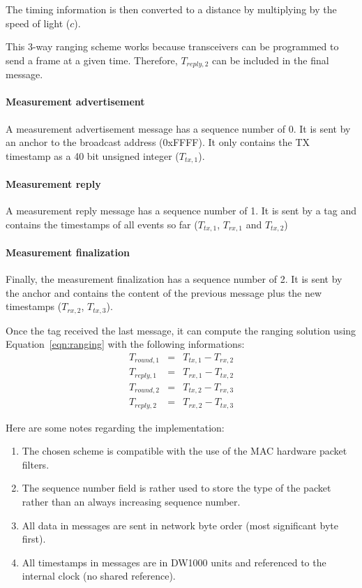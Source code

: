 \documentclass[a4paper, 12pt]{scrreprt}
\begin{document}
The timing information is then converted to a distance by multiplying by the speed of light ($c$).

This 3-way ranging scheme works because transceivers can be programmed to send a frame at a given time.
Therefore, $T_{reply,2}$ can be included in the final message.

\paragraph{Measurement advertisement}
A measurement advertisement message has a sequence number of 0.
It is sent by an anchor to the broadcast address (0xFFFF).
It only contains the TX timestamp as a 40 bit unsigned integer ($T_{tx,1}$).

\paragraph{Measurement reply}
A measurement reply message has a sequence number of 1.
It is sent by a tag and contains the timestamps of all events so far ($T_{tx,1}$, $T_{rx,1}$ and $T_{tx,2}$)

\paragraph{Measurement finalization}
Finally, the measurement finalization has a sequence number of 2.
It is sent by the anchor and contains the content of the previous message plus the new timestamps ($T_{rx,2}$, $T_{tx,3}$).

Once the tag received the last message, it can compute the ranging solution using Equation~\ref{eqn:ranging} with the following informations:
\begin{eqnarray*}
    T_{round,1} &=& T_{tx,1} - T_{rx,2} \\
    T_{reply,1} &=& T_{rx,1} - T_{tx,2} \\
    T_{round,2} &=& T_{tx,2} - T_{rx,3} \\
    T_{reply,2} &=& T_{rx,2} - T_{tx,3}
\end{eqnarray*}




Here are some notes regarding the implementation:

\begin{enumerate}
    \item The chosen scheme is compatible with the use of the  \ieeepan{} MAC hardware packet filters.
    \item The sequence number field is rather used to store the type of the packet rather than an always increasing sequence number.
    \item All data in messages are sent in network byte order (most significant byte first).
    \item All timestamps in messages are in DW1000 units and referenced to the internal clock (no shared reference).
\end{enumerate}
\end{document}
